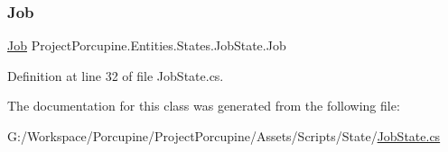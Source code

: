 \subsubsection{\texorpdfstring{Job}{Job}}
{\footnotesize\ttfamily \hyperlink{class_job}{Job} Project\+Porcupine.\+Entities.\+States.\+Job\+State.\+Job\hspace{0.3cm}{\ttfamily [get]}}



Definition at line 32 of file Job\+State.\+cs.



The documentation for this class was generated from the following file\+:\begin{DoxyCompactItemize}
\item 
G\+:/\+Workspace/\+Porcupine/\+Project\+Porcupine/\+Assets/\+Scripts/\+State/\hyperlink{_job_state_8cs}{Job\+State.\+cs}\end{DoxyCompactItemize}
